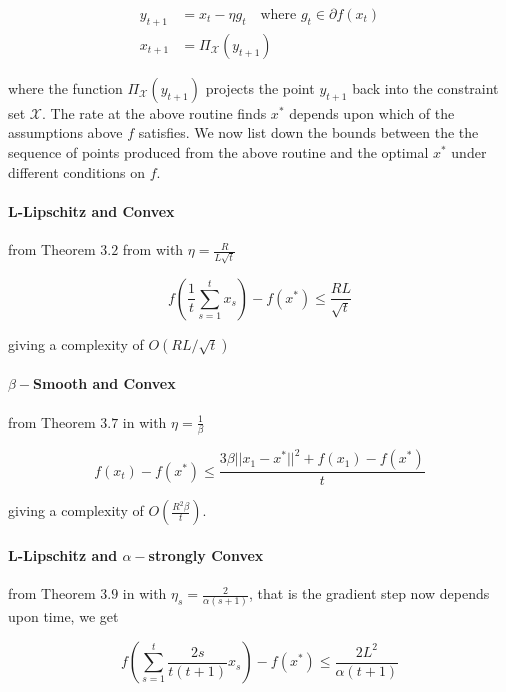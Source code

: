 \begin{align}
y_{t+1} & = x_t - \eta g_t \quad \text{where } g_t \in \partial f(x_t) \\
x_{t+1} & = \Pi_{\mathcal{X}}(y_{t+1})
\label{equ:ProjGradDesc}
\end{align}

where the function $\Pi_{\mathcal{X}}(y_{t+1})$ projects the point $y_{t+1}$ back into the constraint set $\mathcal{X}$. The rate at the above routine finds $x^{*}$ depends upon which of the assumptions above $f$ satisfies.  We now list down the bounds between the the sequence of points produced from the above routine and the optimal $x^{*}$ under different conditions on $f$. 




\paragraph{L-Lipschitz and Convex} from Theorem $3.2$ from \cite{bubeck} with $\eta = \frac{R}{L \sqrt{t}}$

\begin{equation}
f\left( \frac{1}{t} \sum_{s=1}^t x_s\right) - f(x^{*}) \leq \frac{RL}{\sqrt{t}}
\end{equation}

giving a complexity of $O(RL/\sqrt{t})$ 


\paragraph{$\beta-$Smooth and Convex} from Theorem $3.7$ in \cite{bubeck} with $\eta=
\frac{1}{\beta}$ 

\begin{equation}
f\left( x_t \right) - f(x^{*}) \leq \frac{3 \beta ||x_1 - x^{*}||^2 + f(x_1) - f(x^*)}{t}
\end{equation}

giving a complexity of $O\left(\frac{R^2 \beta}{t}\right)$.

\paragraph{L-Lipschitz and $\alpha-$strongly Convex} from Theorem $3.9$ in \cite{bubeck} with $\eta_s = \frac{2}{\alpha(s+1)}$, that is the gradient step now depends upon time, we get


\begin{equation}
f\left( \sum_{s=1}^t \frac{2s}{t(t+1)} x_s\right) - f(x^{*}) \leq \frac{2L^2}{\alpha (t+1)}
\end{equation}

